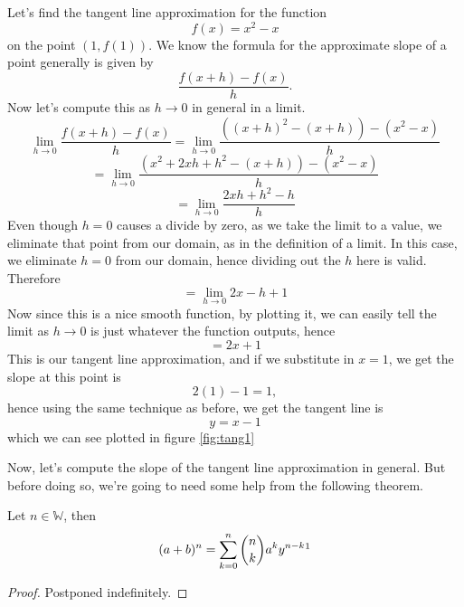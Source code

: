 \begin{ex}
	Let's find the tangent line approximation for the function
	$$f(x)=x^2-x$$
	on the point $(1,f(1))$.
	We know the formula for the approximate slope of a point generally is given by
	$$\frac{f(x+h)-f(x)}{h}.$$
	Now let's compute this as $h\to0$ in general in a limit. 
	$$\lim_{h\to0}\frac{f(x+h)-f(x)}{h}=\lim_{h\to0}\frac{((x+h)^2-(x+h))-(x^2-x)}{h}$$
	$$=\lim_{h\to0}\frac{(x^2+2xh+h^2-(x+h))-(x^2-x)}{h}$$
	$$=\lim_{h\to0}\frac{2xh+h^2-h}{h}$$
	Even though $h=0$ causes a divide by zero, as we take the limit to a value, we eliminate that point from our domain, as in the definition of a limit. In this case, we eliminate $h=0$ from our domain, hence dividing out the $h$ here is valid. Therefore
	$$=\lim_{h\to0}2x-h+1$$
	Now since this is a nice smooth function, by plotting it, we can easily tell the limit as $h\to0$ is just whatever the function outputs, hence
	$$=2x+1$$
	This is our tangent line approximation, and if we substitute in $x=1$, we get the slope at this point is 
	$$2(1)-1=1,$$
	hence using the same technique as before, we get the tangent line is
	$$y=x-1$$
	which we can see plotted in figure \eqref{fig:tang1}
	\begin{figure}
	\centering
		\caption{}
		\label{fig:tang1}
	\end{figure}
	\label{ex:tan1}
\end{ex}

Now, let's compute the slope of the tangent line approximation in general. But before doing so, we're going to need some help from the following theorem.

\begin{thm}
Let $n\in\mathbb{W}$, then
$$(a+b)^n=\sum^n_{k=0}\binom{n}{k}a^ky^{n-k}\footnotemark$$
\label{thm:binomial}
\end{thm}
\addtocounter{footnote}{-1}
\begin{proof}
	Postponed indefinitely.
\end{proof}

